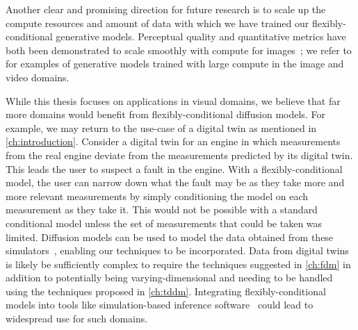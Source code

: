 Another clear and promising direction for future research is to scale up the compute resources and amount of data with which we have trained our flexibly-conditional generative models. Perceptual quality and quantitative metrics have both been demonstrated to scale smoothly with compute for images~\citep{peebles2022scalable}; we refer to \citet{esser2024scaling,brooks2024video} for examples of generative models trained with large compute in the image and video domains.

While this thesis focuses on applications in visual domains, we believe that far more domains would benefit from flexibly-conditional diffusion models. For example, we may return to the use-case of a digital twin as mentioned in \cref{ch:introduction}. Consider a digital twin for an engine in which measurements from the real engine deviate from the measurements predicted by its digital twin. This leads the user to suspect a fault in the engine. With a flexibly-conditional model, the user can narrow down what the fault may be as they take more and more relevant measurements by simply conditioning the model on each measurement as they take it. This would not be possible with a standard conditional model unless the set of measurements that could be taken was limited. Diffusion models can be used to model the data obtained from these simulators~\citep{weilbach2023graphically,gloeckler2024all}, enabling our techniques to be incorporated. Data from digital twins is likely be sufficiently complex to require the techniques suggested in \cref{ch:fdm} in addition to potentially being varying-dimensional and needing to be handled using the techniques proposed in \cref{ch:tddm}. Integrating flexibly-conditional models into tools like simulation-based inference software~\citep{gloeckler2024all} could lead to widespread use for such domains.

